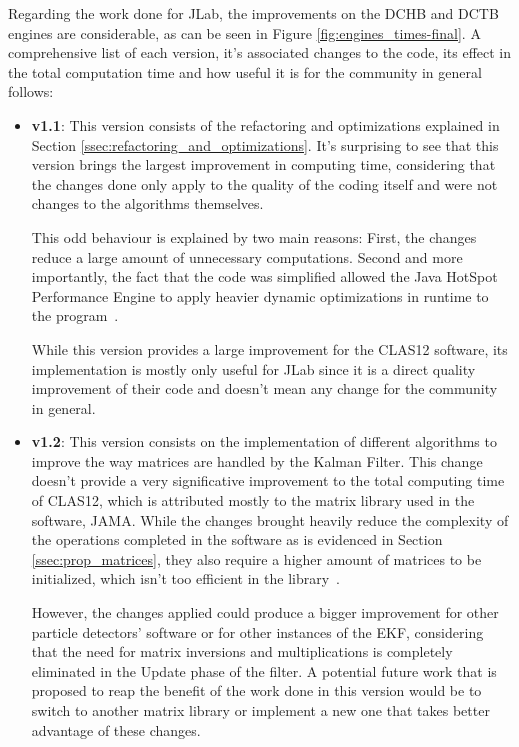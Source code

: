 Regarding the work done for JLab, the improvements on the DCHB and DCTB engines are considerable, as can be seen in Figure \ref{fig:engines_times-final}.
A comprehensive list of each version, it's associated changes to the code, its effect in the total computation time and how useful it is for the community in general follows:
    \begin{itemize}
        \item \textbf{v1.1}: This version consists of the refactoring and optimizations explained in Section \ref{ssec:refactoring_and_optimizations}.
        It's surprising to see that this version brings the largest improvement in computing time, considering that the changes done only apply to the quality of the coding itself and were not changes to the algorithms themselves.

        This odd behaviour is explained by two main reasons: First, the changes reduce a large amount of unnecessary computations.
        Second and more importantly, the fact that the code was simplified allowed the Java HotSpot Performance Engine to apply heavier dynamic optimizations in runtime to the program~\cite{hunt2011java}.
        
        While this version provides a large improvement for the CLAS12 software, its implementation is mostly only useful for JLab since it is a direct quality improvement of their code and doesn't mean any change for the community in general. %
        
        \item \textbf{v1.2}: This version consists on the implementation of different algorithms to improve the way matrices are handled by the Kalman Filter.
        This change doesn't provide a very significative improvement to the total computing time of CLAS12, which is attributed mostly to the matrix library used in the software, JAMA.
        While the changes brought heavily reduce the complexity of the operations completed in the software as is evidenced in Section \ref{ssec:prop_matrices}, they also require a higher amount of matrices to be initialized, which isn't too efficient in the library~\cite{hicklin2000jama}. %
        
        However, the changes applied could produce a bigger improvement for other particle detectors' software or for other instances of the EKF, considering that the need for matrix inversions and multiplications is completely eliminated in the Update phase of the filter.
        A potential future work that is proposed to reap the benefit of the work done in this version would be to switch to another matrix library or implement a new one that takes better advantage of these changes.
        

\end{itemize}

